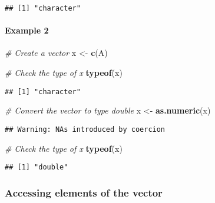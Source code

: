 \documentclass[
]{article}
\newenvironment{Shaded}{\begin{snugshade}}{\end{snugshade}}
\newcommand{\CommentTok}[1]{\textcolor[rgb]{0.56,0.35,0.01}{\textit{#1}}}
\newcommand{\FunctionTok}[1]{\textcolor[rgb]{0.13,0.29,0.53}{\textbf{#1}}}
\newcommand{\NormalTok}[1]{#1}
\newcommand{\OtherTok}[1]{\textcolor[rgb]{0.56,0.35,0.01}{#1}}
\newcommand{\StringTok}[1]{\textcolor[rgb]{0.31,0.60,0.02}{#1}}
\begin{document}
\begin{verbatim}
## [1] "character"
\end{verbatim}

\hypertarget{example-2-1}{%
\paragraph{Example 2}\label{example-2-1}}

\begin{Shaded}
\begin{Highlighting}[]
\CommentTok{\# Create a vector}
\NormalTok{x }\OtherTok{\textless{}{-}} \FunctionTok{c}\NormalTok{(}\StringTok{\textquotesingle{}A\textquotesingle{}}\NormalTok{)}

\CommentTok{\# Check the type of x}
\FunctionTok{typeof}\NormalTok{(x)}
\end{Highlighting}
\end{Shaded}

\begin{verbatim}
## [1] "character"
\end{verbatim}

\begin{Shaded}
\begin{Highlighting}[]
\CommentTok{\# Convert the vector to type double}
\NormalTok{x }\OtherTok{\textless{}{-}} \FunctionTok{as.numeric}\NormalTok{(x)}
\end{Highlighting}
\end{Shaded}

\begin{verbatim}
## Warning: NAs introduced by coercion
\end{verbatim}

\begin{Shaded}
\begin{Highlighting}[]
\CommentTok{\# Check the type of x}
\FunctionTok{typeof}\NormalTok{(x)}
\end{Highlighting}
\end{Shaded}

\begin{verbatim}
## [1] "double"
\end{verbatim}

\hypertarget{accessing-elements-of-the-vector}{%
\subsubsection{Accessing elements of the
vector}\label{accessing-elements-of-the-vector}}
\end{document}
